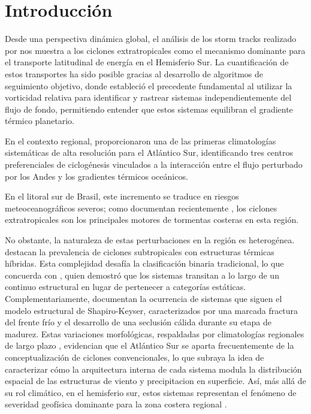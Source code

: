 \chapter{Introducción} \label{ch:introduccion}


Desde una perspectiva dinámica global, el análisis de los storm tracks realizado por \citet{hoskins2005new} nos muestra a los ciclones extratropicales como el mecanismo dominante para el transporte latitudinal de energía en el Hemisferio Sur. La cuantificación de estos transportes ha sido posible gracias al desarrollo de algoritmos de seguimiento objetivo, donde \citet{sinclair1994objective} estableció el precedente fundamental al utilizar la vorticidad relativa para identificar y rastrear sistemas independientemente del flujo de fondo, permitiendo entender que estos sistemas equilibran el gradiente térmico planetario.

En el contexto regional, \citet{reboita2010south} proporcionaron una de las primeras climatologías sistemáticas de alta resolución para el Atlántico Sur, identificando tres centros preferenciales de ciclogénesis vinculados a la interacción entre el flujo perturbado por los Andes y los gradientes térmicos oceánicos. 

En el litoral sur de Brasil, este incremento se traduce en riesgos meteoceanográficos severos; como documentan recientemente \citet{miranda2026patterns}, los ciclones extratropicales son los principales motores de tormentas costeras en esta región.

No obstante, la naturaleza de estas perturbaciones en la región es heterogénea. \citet{evans2012climatology} destacan la prevalencia de ciclones subtropicales con estructuras térmicas híbridas. Esta complejidad desafía la clasificación binaria tradicional, lo que concuerda con \citet{hart2003cyclone}, quien demostró que los sistemas transitan a lo largo de un continuo estructural en lugar de pertenecer a categorías estáticas. Complementariamente, \citet{gozzo2013air} documentan la ocurrencia de sistemas que siguen el modelo estructural de Shapiro-Keyser, caracterizados por una marcada fractura del frente frío y el desarrollo de una seclusión cálida durante su etapa de madurez. Estas variaciones morfológicas, respaldadas por climatologías regionales de largo plazo \citep{gozzo2014subtropical}, evidencian que el Atlántico Sur se aparta frecuentemente de la conceptualización de ciclones convencionales, lo que subraya la idea de caracterizar cómo la arquitectura interna de cada sistema modula la distribución espacial de las estructuras de viento y precipitacion en superficie. Así, más allá de su rol climático, en el hemisferio sur, estos sistemas representan el fenómeno de severidad geofísica dominante para la zona costera regional \citep{gramcianinov2023impact}.

